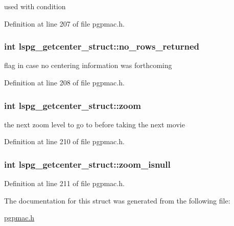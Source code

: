 used with condition 



Definition at line 207 of file pgpmac.\-h.

\hypertarget{structlspg__getcenter__struct_aaeb0ccf4289b4fb306c2bc04ae85b237}{
\subsubsection[{no\-\_\-rows\-\_\-returned}]{\setlength{\rightskip}{0pt plus 5cm}int lspg\-\_\-getcenter\-\_\-struct\-::no\-\_\-rows\-\_\-returned}}\label{structlspg__getcenter__struct_aaeb0ccf4289b4fb306c2bc04ae85b237}


flag in case no centering information was forthcoming 



Definition at line 208 of file pgpmac.\-h.

\hypertarget{structlspg__getcenter__struct_a63e640a925611d2404a1529aea30a853}{
\subsubsection[{zoom}]{\setlength{\rightskip}{0pt plus 5cm}int lspg\-\_\-getcenter\-\_\-struct\-::zoom}}\label{structlspg__getcenter__struct_a63e640a925611d2404a1529aea30a853}


the next zoom level to go to before taking the next movie 



Definition at line 210 of file pgpmac.\-h.

\hypertarget{structlspg__getcenter__struct_a6ca85a8de29039188357b2814acd7803}{
\subsubsection[{zoom\-\_\-isnull}]{\setlength{\rightskip}{0pt plus 5cm}int lspg\-\_\-getcenter\-\_\-struct\-::zoom\-\_\-isnull}}\label{structlspg__getcenter__struct_a6ca85a8de29039188357b2814acd7803}


Definition at line 211 of file pgpmac.\-h.



The documentation for this struct was generated from the following file\-:\begin{DoxyCompactItemize}
\item 
\hyperlink{pgpmac_8h}{pgpmac.\-h}\end{DoxyCompactItemize}
